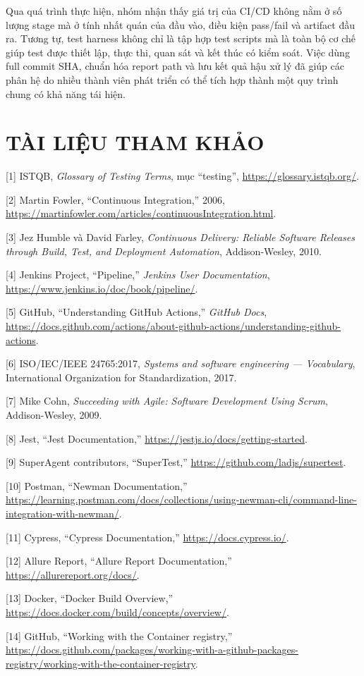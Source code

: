 \documentclass[
  vietnamese,
  12pt,
  a4paper,
  oneside]{report}
\begin{document}
Qua quá trình thực hiện, nhóm nhận thấy giá trị của CI/CD không nằm ở số
lượng stage mà ở tính nhất quán của đầu vào, điều kiện pass/fail và
artifact đầu ra. Tương tự, test harness không chỉ là tập hợp test
scripts mà là toàn bộ cơ chế giúp test được thiết lập, thực thi, quan
sát và kết thúc có kiểm soát. Việc dùng full commit SHA, chuẩn hóa
report path và lưu kết quả hậu xử lý đã giúp các phân hệ do nhiều thành
viên phát triển có thể tích hợp thành một quy trình chung có khả năng
tái hiện.

\chapter{TÀI LIỆU THAM KHẢO}\label{tuxe0i-liux1ec7u-tham-khux1ea3o}

{[}1{]} ISTQB, \emph{Glossary of Testing Terms}, mục ``testing'',
\url{https://glossary.istqb.org/}.

{[}2{]} Martin Fowler, ``Continuous Integration,'' 2006,
\url{https://martinfowler.com/articles/continuousIntegration.html}.

{[}3{]} Jez Humble và David Farley, \emph{Continuous Delivery: Reliable
Software Releases through Build, Test, and Deployment Automation},
Addison-Wesley, 2010.

{[}4{]} Jenkins Project, ``Pipeline,'' \emph{Jenkins User
Documentation}, \url{https://www.jenkins.io/doc/book/pipeline/}.

{[}5{]} GitHub, ``Understanding GitHub Actions,'' \emph{GitHub Docs},
\url{https://docs.github.com/actions/about-github-actions/understanding-github-actions}.

{[}6{]} ISO/IEC/IEEE 24765:2017, \emph{Systems and software engineering
--- Vocabulary}, International Organization for Standardization, 2017.

{[}7{]} Mike Cohn, \emph{Succeeding with Agile: Software Development
Using Scrum}, Addison-Wesley, 2009.

{[}8{]} Jest, ``Jest Documentation,''
\url{https://jestjs.io/docs/getting-started}.

{[}9{]} SuperAgent contributors, ``SuperTest,''
\url{https://github.com/ladjs/supertest}.

{[}10{]} Postman, ``Newman Documentation,''
\url{https://learning.postman.com/docs/collections/using-newman-cli/command-line-integration-with-newman/}.

{[}11{]} Cypress, ``Cypress Documentation,''
\url{https://docs.cypress.io/}.

{[}12{]} Allure Report, ``Allure Report Documentation,''
\url{https://allurereport.org/docs/}.

{[}13{]} Docker, ``Docker Build Overview,''
\url{https://docs.docker.com/build/concepts/overview/}.

{[}14{]} GitHub, ``Working with the Container registry,''
\url{https://docs.github.com/packages/working-with-a-github-packages-registry/working-with-the-container-registry}.
\end{document}

